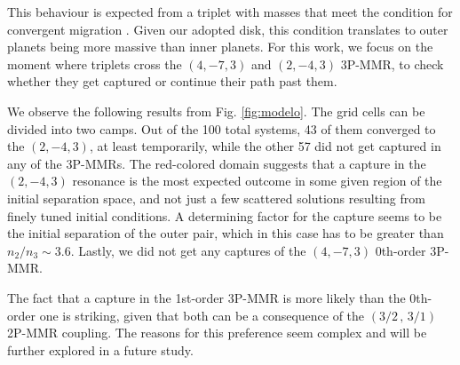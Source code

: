 \documentclass[baaa]{baaa}
\begin{document}
This behaviour is expected from a triplet with masses that meet the condition for convergent migration \citep{beauge.cerioni.2022}.
Given our adopted disk, this condition translates to outer planets being more massive than inner planets.
For this work, we focus on the moment where triplets cross the $(4,-7,3)$ and $(2,-4,3)$ 3P-MMR, to check whether they get captured or continue their path past them.


We observe the following results from Fig. \ref{fig:modelo}.
The grid cells can be divided into two camps.
Out of the 100 total systems, 43 of them converged to the $(2,-4,3)$, at least temporarily, while the other 57 did not get captured in any of the 3P-MMRs.
The red-colored domain suggests that a capture in the $(2,-4,3)$ resonance is the most expected outcome in some given region of the initial separation space, and not just a few scattered solutions resulting from finely tuned initial conditions.
A determining factor for the capture seems to be the initial separation of the outer pair, which in this case has to be greater than $n_2/n_3\sim 3.6$.
Lastly, we did not get any captures of the $(4,-7,3)$ 0th-order 3P-MMR.



The fact that a capture in the 1st-order 3P-MMR is more likely than the 0th-order one is striking, given that both can be a consequence of the $(3/2\,,\,3/1)$ 2P-MMR coupling.
The reasons for this preference seem complex and will be further explored in a future study.
\end{document}
